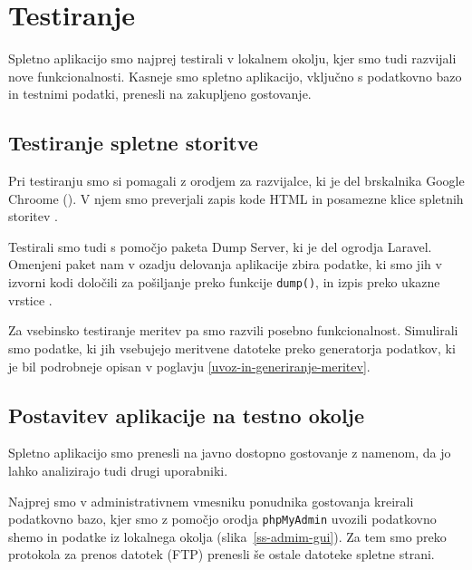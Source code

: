 \documentclass[a4paper, 12pt]{book}
\begin{document}
\chapter{Testiranje}
\label{testiranje}

Spletno aplikacijo smo najprej testirali v lokalnem okolju, kjer smo tudi razvijali nove funkcionalnosti. Kasneje smo spletno aplikacijo, vključno s podatkovno bazo in testnimi podatki, prenesli na zakupljeno gostovanje.

\section{Testiranje spletne storitve}

Pri testiranju smo si pomagali z orodjem za razvijalce, ki je del brskalnika Google Chroome (). V njem smo preverjali zapis kode HTML in posamezne klice spletnih storitev \cite{google-devtools}.

Testirali smo tudi s pomočjo paketa Dump Server, ki je del ogrodja Laravel. Omenjeni paket nam v ozadju delovanja aplikacije zbira podatke, ki smo jih v izvorni kodi določili za pošiljanje preko funkcije \verb=dump()=, in izpis preko ukazne vrstice \cite{laravel-dump}.

Za vsebinsko testiranje meritev pa smo razvili posebno funkcionalnost. Simulirali smo podatke, ki jih vsebujejo meritvene datoteke preko generatorja podatkov, ki je bil podrobneje opisan v poglavju \ref{uvoz-in-generiranje-meritev}.


\section{Postavitev aplikacije na testno okolje}

Spletno aplikacijo smo prenesli na javno dostopno gostovanje z namenom, da jo lahko analizirajo tudi drugi uporabniki.

Najprej smo v administrativnem vmesniku ponudnika gostovanja kreirali podatkovno bazo, kjer smo z pomočjo orodja \verb=phpMyAdmin= \cite{phpmyadmin-framework} uvozili podatkovno shemo in podatke iz lokalnega okolja (slika~\ref{ss-admim-gui}). Za tem smo preko protokola za prenos datotek (FTP) prenesli še ostale datoteke spletne strani.
\end{document}
